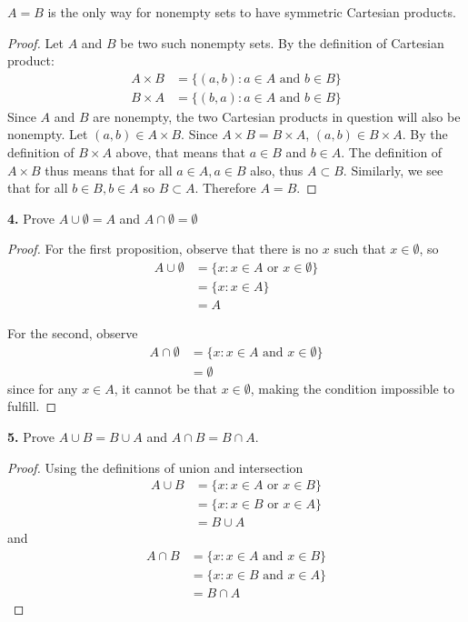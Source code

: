 \documentclass[12pt]{amsart}
\newenvironment{statement}[1]{\smallskip\noindent\color[rgb]{1.00,0.00,0.50} {\bf #1.}}{}
\theoremstyle{definition}
\theoremstyle{remark}
\begin{document}
$A = B$ is the only way for nonempty sets to have symmetric Cartesian
products.
\begin{proof}
Let $A$ and $B$ be two such nonempty sets. By the definition of Cartesian product:
\begin{align*}
  A \times B &= \{ (a,b) : a \in A \text{ and } b \in B \} \\
  B \times A &= \{ (b,a) : a \in A \text{ and } b \in B \}
\end{align*}
Since $A$ and $B$ are nonempty, the two Cartesian products in question
will also be nonempty. Let $(a,b) \in A \times B$. Since $A \times B =
B \times A$, $(a,b) \in B \times A$. By the definition of $B \times A$
above, that means that $a \in B$ and $b \in A$. The definition of $A
\times B$ thus means that for all $a \in A, a \in B$ also, thus $A
\subset B$. Similarly, we see that for all $b \in B, b \in A$ so $B
\subset A$. Therefore $A=B$.
\end{proof}


\begin{statement}{4}
Prove $A \cup \emptyset = A$ and $A \cap \emptyset = \emptyset $
\end{statement}
\begin{proof}
  For the first proposition, observe that there is no $x$ such that $x \in \emptyset$, so
  \begin{align*}
    A \cup \emptyset &= \{ x : x \in A \text{ or } x \in \emptyset \} \\
    &= \{ x : x \in A \} \\
    &= A
  \end{align*}

  For the second, observe
  \begin{align*}
    A \cap \emptyset &= \{ x : x \in A \text{ and } x \in \emptyset \} \\
    &= \emptyset
  \end{align*}
  since for any $x \in A$, it cannot be that $x \in \emptyset$, making
  the condition impossible to fulfill.
\end{proof}

\begin{statement}{5}
Prove $A \cup B = B \cup A$ and $A \cap B = B \cap A$.
\end{statement}
\begin{proof}
Using the definitions of union and intersection
\begin{align*}
  A \cup B &= \{x : x \in A \text{ or } x \in B\} \\
    &= \{x : x \in B \text{ or } x \in A\} \\
      &= B \cup A
\end{align*}
and
\begin{align*}
  A \cap B &= \{x : x \in A \text{ and } x \in B\} \\
    &= \{x : x \in B \text{ and } x \in A\} \\
      &= B \cap A
\end{align*}

\end{proof}
\end{document}
